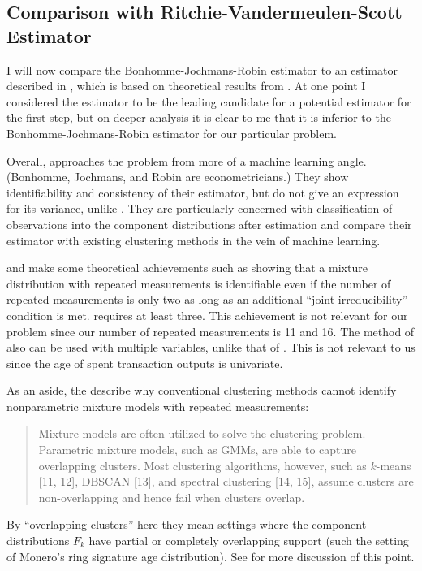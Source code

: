 \documentclass[english]{article}
\begin{document}
\subsection{Comparison with Ritchie-Vandermeulen-Scott Estimator}

I will now compare the Bonhomme-Jochmans-Robin estimator to an estimator
described in \cite{ritchie2020consistent}, which is based on theoretical
results from \cite{VandermeulenScott2019}. At one point I considered
the \cite{ritchie2020consistent} estimator to be the leading candidate
for a potential estimator for the first step, but on deeper analysis
it is clear to me that it is inferior to the Bonhomme-Jochmans-Robin
estimator for our particular problem.

Overall, \cite{ritchie2020consistent} approaches the problem from
more of a machine learning angle. (Bonhomme, Jochmans, and Robin are
econometricians.) They show identifiability and consistency of their
estimator, but do not give an expression for its variance, unlike
\cite{Bonhomme2016}. They are particularly concerned with classification
of observations into the component distributions after estimation
and compare their estimator with existing clustering methods in the
vein of machine learning.

\cite{ritchie2020consistent} and \cite{VandermeulenScott2019} make
some theoretical achievements such as showing that a mixture distribution
with repeated measurements is identifiable even if the number of repeated
measurements is only two as long as an additional ``joint irreducibility''
condition is met. \cite{Bonhomme2016} requires at least three. This
achievement is not relevant for our problem since our number of repeated
measurements is 11 and 16. The method of \cite{ritchie2020consistent}
also can be used with multiple variables, unlike that of \cite{Bonhomme2016}.
This is not relevant to us since the age of spent transaction outputs
is univariate.

As an aside, the \cite{ritchie2020consistent} describe why conventional
clustering methods cannot identify nonparametric mixture models with
repeated measurements:
\begin{quote}
Mixture models are often utilized to solve the clustering problem.
Parametric mixture models, such as GMMs, are able to capture overlapping
clusters. Most clustering algorithms, however, such as $k$-means
{[}11, 12{]}, DBSCAN {[}13{]}, and spectral clustering {[}14, 15{]},
assume clusters are non-overlapping and hence fail when clusters overlap.
\end{quote}
By ``overlapping clusters'' here they mean settings where the component
distributions $F_{k}$ have partial or completely overlapping support
(such the setting of Monero's ring signature age distribution). See
\cite{Vankadara2021} for more discussion of this point.
\end{document}
